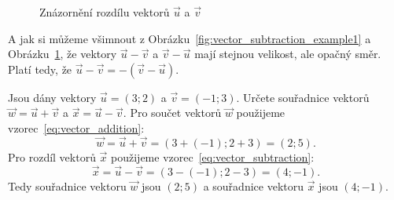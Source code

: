 \begin{figure}[H]
    \centering
    
    \caption{Znázornění rozdílu vektorů $\vec{u}$ a $\vec{v}$}
    \label{fig:vector_subtraction_example2}
\end{figure}

A jak si můžeme všimnout z Obrázku~\ref{fig:vector_subtraction_example1} a Obrázku~\ref{fig:vector_subtraction_example2},
že vektory $\vec{u} - \vec{v}$ a $\vec{v} - \vec{u}$ mají stejnou velikost, ale opačný směr.
Platí tedy, že $\vec{u} - \vec{v} = -(\vec{v} - \vec{u})$.

\begin{example}
    Jsou dány vektory $\vec{u} = (3; 2)$ a $\vec{v} = (-1; 3)$. Určete souřadnice vektorů $\vec{w} = \vec{u} + \vec{v}$ a $\vec{x} = \vec{u} - \vec{v}$.
    Pro součet vektorů $\vec{w}$ použijeme vzorec~\eqref{eq:vector_addition}:
    \[
    \vec{w} = \vec{u} + \vec{v} = (3 + (-1); 2 + 3) = (2; 5).
    \]
    Pro rozdíl vektorů $\vec{x}$ použijeme vzorec~\eqref{eq:vector_subtraction}:
    \[
    \vec{x} = \vec{u} - \vec{v} = (3 - (-1); 2 - 3) = (4; -1).
    \]
    Tedy souřadnice vektoru $\vec{w}$ jsou $(2; 5)$ a souřadnice vektoru $\vec{x}$ jsou $(4; -1)$.
\end{example}


